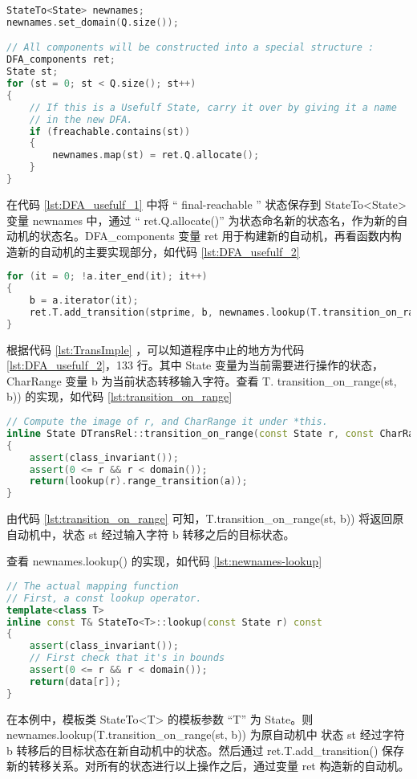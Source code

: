 \begin{lstlisting}[language=C++,label={lst:DFA_usefulf_1},caption={ DFA.cpp },firstnumber=84]
StateTo<State> newnames;
newnames.set_domain(Q.size());

// All components will be constructed into a special structure :
DFA_components ret;
State st;
for (st = 0; st < Q.size(); st++)
{
    // If this is a Usefulf State, carry it over by giving it a name
    // in the new DFA.
    if (freachable.contains(st))
    {
        newnames.map(st) = ret.Q.allocate();
    }
}
\end{lstlisting}
在代码 \ref{lst:DFA_usefulf_1} 中将 “ final-reachable ” 状态保存到 StateTo<State> 变量 newnames 中，通过 “ ret.Q.allocate()” 为状态命名新的状态名，作为新的自动机的状态名。DFA\_components 变量 ret 用于构建新的自动机，再看函数内构造新的自动机的主要实现部分，如代码 \ref{lst:DFA_usefulf_2}

\begin{lstlisting}[language=C++,label={lst:DFA_usefulf_2},caption={ DFA.cpp },firstnumber=130]
for (it = 0; !a.iter_end(it); it++)
{
    b = a.iterator(it);
    ret.T.add_transition(stprime, b, newnames.lookup(T.transition_on_range(st, b)));
}
\end{lstlisting}

根据代码 \ref{lst:TransImple} ，可以知道程序中止的地方为代码 \ref{lst:DFA_usefulf_2}，133 行。其中 State 变量为当前需要进行操作的状态，CharRange 变量 b 为当前状态转移输入字符。查看 T.
transition\_on\_range(st, b)) 的实现，如代码 \ref{lst:transition_on_range}

\begin{lstlisting}[language=C++,label={lst:transition_on_range},caption={ DTransRel.cpp },firstnumber=108]
// Compute the image of r, and CharRange it under *this.
inline State DTransRel::transition_on_range(const State r, const CharRange a) const
{
    assert(class_invariant());
    assert(0 <= r && r < domain());
    return(lookup(r).range_transition(a));
}
\end{lstlisting}
由代码 \ref{lst:transition_on_range} 可知，T.transition\_on\_range(st, b)) 将返回原自动机中，状态 st 经过输入字符 b 转移之后的目标状态。

查看 newnames.lookup() 的实现，如代码 \ref{lst:newnames-lookup}

\begin{lstlisting}[language=C++,label={lst:newnames-lookup},caption={ StateTo.h },firstnumber=177]
// The actual mapping function
// First, a const lookup operator.
template<class T>
inline const T& StateTo<T>::lookup(const State r) const
{
    assert(class_invariant());
    // First check that it's in bounds
    assert(0 <= r && r < domain());
    return(data[r]);
}
\end{lstlisting}
在本例中，模板类 StateTo<T> 的模板参数 “T” 为 State。则 newnames.lookup(T.transition\_on\_range(st, b)) 为原自动机中 状态 st 经过字符 b 转移后的目标状态在新自动机中的状态。然后通过 ret.T.add\_transition() 保存新的转移关系。对所有的状态进行以上操作之后，通过变量 ret 构造新的自动机。 


